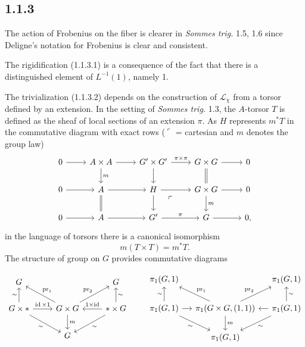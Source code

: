 \documentclass[deligne.tex]{subfiles}
\begin{document}
\subsection*{1.1.3} The action of Frobenius on the fiber is clearer
in \emph{Sommes trig.} 1.5, 1.6 since Deligne's notation for Frobenius is 
clear and consistent.

The rigidification (1.1.3.1) is a consequence of the fact that there is a
distinguished element of $L^{-1}(1)$, namely 1.

The trivialization (1.1.3.2) depends on the construction of $\mathscr L_\chi$
from a torsor defined by an extension. In the setting of \emph{Sommes trig.}
1.3, the $A$-torsor $T$ is defined as the sheaf of local sections of an 
extension $\pi$. As $H$ represents $m^*T$ in the commutative diagram with
exact rows ($\ulcorner$ = cartesian and $m$ denotes the group law)
\begin{equation*}\begin{tikzcd}
	0\arrow[r]&A\times A\arrow[r]\arrow[d,"m"]&G'\times G'\arrow[r,"\pi\times\pi"]\arrow[d]&G\times G\arrow[r]\arrow[d,equals]&0 \\
	0\arrow[r]&A\arrow[r]\arrow[d,equals]&H\arrow[r]\arrow[d]&G\times G\arrow[r]\arrow[d,"m"]&0 \\
	0\arrow[r]&A\arrow[r]&G'\arrow[r,"\pi"]&G\arrow[r]\arrow[ul,phantom,"\ulcorner",near end]&0,
\end{tikzcd}\end{equation*}
in the language of torsors there is a canonical isomorphism
\begin{equation*}
	m(T\times T)=m^*T.
\end{equation*}
The structure of group on $G$ provides commutative diagrams
\begin{ceqn}\begin{equation*}\begin{tikzcd}
	G&&G \\
	G\times *\arrow[u,"\sim"]\arrow[r,"\id\times1"]\arrow[dr,"\sim"']&G\times G\arrow[ul,"\pr_1"']\arrow[ur,"\pr_2"]\arrow[d,"m"]&*\times G\arrow[u,"\sim"']\arrow[l,"1\times\id"']\arrow[dl,"\sim"] \\
	&G
\end{tikzcd}\qquad
\begin{tikzcd}[column sep=small]
	\pi_1(G,1)&&\pi_1(G,1) \\
	\pi_1(G,1)\arrow[u,"\sim"]\arrow[r]\arrow[dr,"\sim"']&\pi_1(G\times G,(1,1))\arrow[ul,"\pr_1"']\arrow[ur,"\pr_2"]\arrow[d,"m"]&\pi_1(G,1)\arrow[u,"\sim"']\arrow[l]\arrow[dl,"\sim"] \\
	&\pi_1(G,1)
\end{tikzcd}
\end{equation*}\end{ceqn}
\end{document}
